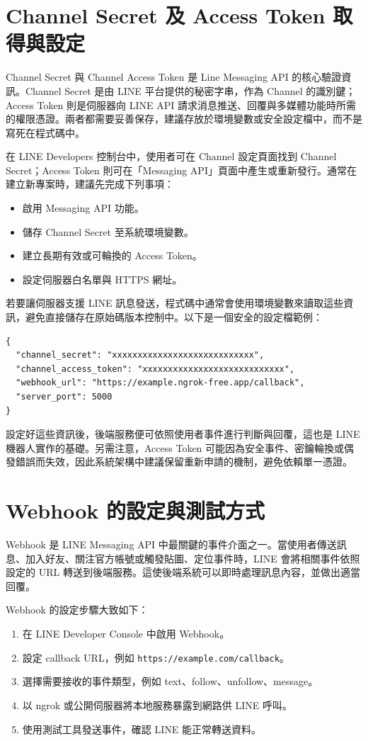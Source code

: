 \section{Channel Secret 及 Access Token 取得與設定}

Channel Secret 與 Channel Access Token 是 Line Messaging API 的核心驗證資訊。Channel Secret 是由 LINE 平台提供的秘密字串，作為 Channel 的識別鍵；Access Token 則是伺服器向 LINE API 請求消息推送、回覆與多媒體功能時所需的權限憑證。兩者都需要妥善保存，建議存放於環境變數或安全設定檔中，而不是寫死在程式碼中。

在 LINE Developers 控制台中，使用者可在 Channel 設定頁面找到 Channel Secret；Access Token 則可在「Messaging API」頁面中產生或重新發行。通常在建立新專案時，建議先完成下列事項：
\begin{itemize}[leftmargin=2em]
    \item 啟用 Messaging API 功能。
    \item 儲存 Channel Secret 至系統環境變數。
    \item 建立長期有效或可輪換的 Access Token。
    \item 設定伺服器白名單與 HTTPS 網址。
\end{itemize}

若要讓伺服器支援 LINE 訊息發送，程式碼中通常會使用環境變數來讀取這些資訊，避免直接儲存在原始碼版本控制中。以下是一個安全的設定檔範例：

\begin{lstlisting}[caption={環境變數設定範例}]
{
  "channel_secret": "xxxxxxxxxxxxxxxxxxxxxxxxxxxx",
  "channel_access_token": "xxxxxxxxxxxxxxxxxxxxxxxxxxxx",
  "webhook_url": "https://example.ngrok-free.app/callback",
  "server_port": 5000
}
\end{lstlisting}

設定好這些資訊後，後端服務便可依照使用者事件進行判斷與回覆，這也是 LINE 機器人實作的基礎。另需注意，Access Token 可能因為安全事件、密鑰輪換或偶發錯誤而失效，因此系統架構中建議保留重新申請的機制，避免依賴單一憑證。

\section{Webhook 的設定與測試方式}

Webhook 是 LINE Messaging API 中最關鍵的事件介面之一。當使用者傳送訊息、加入好友、關注官方帳號或觸發貼圖、定位事件時，LINE 會將相關事件依照設定的 URL 轉送到後端服務。這使後端系統可以即時處理訊息內容，並做出適當回覆。

Webhook 的設定步驟大致如下：
\begin{enumerate}[leftmargin=2em]
    \item 在 LINE Developer Console 中啟用 Webhook。
    \item 設定 callback URL，例如 \texttt{https://example.com/callback}。
    \item 選擇需要接收的事件類型，例如 text、follow、unfollow、message。 
    \item 以 ngrok 或公開伺服器將本地服務暴露到網路供 LINE 呼叫。
    \item 使用測試工具發送事件，確認 LINE 能正常轉送資料。
\end{enumerate}

